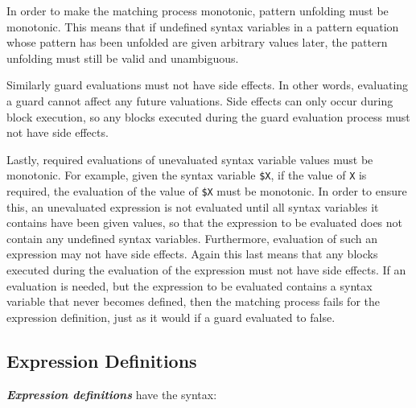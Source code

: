 \documentclass[12pt]{article}
\newcommand{\ikey}[2]{{\bf \em #1}\index{#2}}
\begin{document}
In order to make the matching process monotonic, pattern unfolding must
be monotonic.  This means that if undefined syntax variables in a pattern
equation whose pattern has been unfolded are given arbitrary values later,
the pattern unfolding must still be valid and unambiguous.

Similarly guard evaluations must not have side effects.  In other
words, evaluating a guard cannot affect any future valuations.
Side effects can only occur during block execution, so any blocks
executed during the guard evaluation process must not have side effects.

Lastly, required evaluations of unevaluated syntax variable values
must be monotonic.  For example, given the syntax variable \verb|$X|,
if the value of \verb|X| is required, the evaluation of the value of
\verb|$X| must be monotonic.
In order to ensure this, an unevaluated expression is not evaluated until
all syntax variables it contains have been given values, so that
the expression to be evaluated does not contain any undefined syntax
variables.  Furthermore, evaluation of such an expression may not have
side effects.  Again this last means that any blocks executed during
the evaluation of the expression must not have side effects.
If an evaluation is needed, but the expression to be evaluated contains
a syntax variable that never becomes defined,
then the matching process fails for the expression definition, just as it
would if a guard evaluated to false.

\subsection{Expression Definitions}
\label{EXPRESSION-DEFINITION}

\ikey{Expression definitions}{expression definition} have the syntax:
\end{document}
